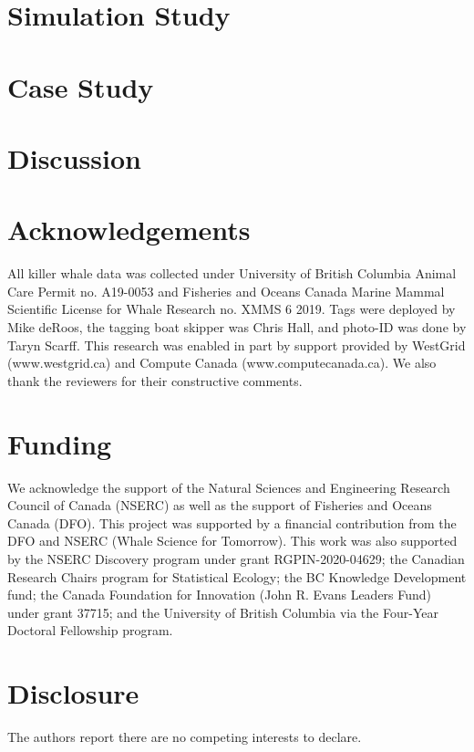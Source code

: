 \documentclass[11pt]{article}
\begin{document}
\section{Simulation Study}


\section{Case Study}


\section{Discussion}


\section*{Acknowledgements}
All killer whale data was collected under University of British Columbia Animal Care Permit no. A19-0053 and Fisheries and Oceans Canada Marine Mammal Scientific License for Whale Research no. XMMS 6 2019. Tags were deployed by Mike deRoos, the tagging boat skipper was Chris Hall, and photo-ID was done by Taryn Scarff. This research was enabled in part by support provided by WestGrid (www.westgrid.ca) and Compute Canada (www.computecanada.ca). We also thank the reviewers for their constructive comments.

\section*{Funding}
We acknowledge the support of the Natural Sciences and Engineering Research Council of Canada (NSERC) as well as the support of Fisheries and Oceans Canada (DFO). This project was supported by a financial contribution from the DFO and NSERC (Whale Science for Tomorrow). This work was also supported by the NSERC Discovery program under grant RGPIN-2020-04629; the Canadian Research Chairs program for Statistical Ecology; the BC Knowledge Development fund; the Canada Foundation for Innovation (John R. Evans Leaders Fund) under grant 37715; and the University of British Columbia via the Four-Year Doctoral Fellowship program.

\section*{Disclosure}
The authors report there are no competing interests to declare.
\end{document}
